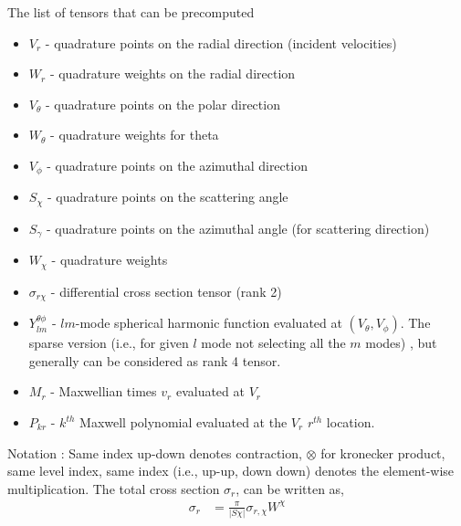 
The list of tensors that can be precomputed
\begin{itemize}
	\item $V_r$ - quadrature points on the radial direction (incident velocities)
	\item $W_r$ - quadrature weights on the radial direction
	\item $V_\theta$ - quadrature points on the polar direction 
	\item $W_\theta$ - quadrature weights for theta
	\item $V_\phi$ - quadrature points on the azimuthal direction 
	\item $S_\chi$ - quadrature points on the scattering angle
	\item $S_\gamma$ - quadrature points on the azimuthal angle (for scattering direction)
	\item $W_\chi$ - quadrature weights
	\item $\sigma_{r\chi}$ - differential cross section tensor (rank 2)
	\item $Y_{lm}^{\theta\phi}$ - $lm$-mode spherical harmonic function evaluated at $(V_\theta, V_\phi)$. The sparse version (i.e., for given $l$ mode not selecting all the $m$ modes) , but generally can be considered as rank 4 tensor. 
	\item $M_r$ - Maxwellian times $v_r$ evaluated at $V_r$
	\item $P_{kr}$     - $k^{th}$ Maxwell polynomial evaluated at the $V_r$ $r^{th}$ location.
\end{itemize}
Notation : Same index up-down denotes contraction, $\otimes$ for kronecker product, same level index, same index (i.e., up-up, down down) denotes the element-wise multiplication. 
The total cross section $\sigma_r$, can be written as, 
\begin{align}
\sigma_r &= \frac{\pi}{|S\chi|} \sigma_{r,\chi} W^\chi
\end{align}

